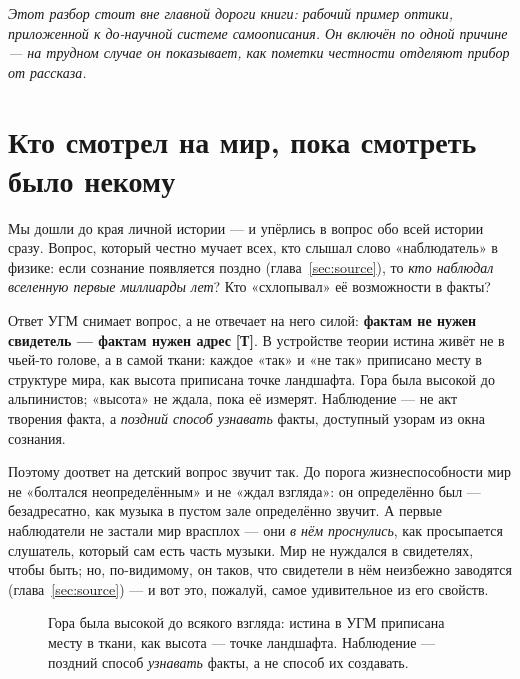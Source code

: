 \documentclass[11pt,letterpaper]{article}
\newcommand{\stT}{\textbf{[Т]}\xspace}
\begin{document}
\noindent\emph{Этот разбор стоит вне главной дороги книги:
рабочий пример оптики, приложенной к до-научной системе
самоописания. Он включён по одной причине --- на трудном случае
он показывает, как пометки честности отделяют прибор от
рассказа.}\medskip

\section{Кто смотрел на мир, пока смотреть было некому}
\label{sec:observer}

Мы дошли до края личной истории --- и упёрлись в вопрос обо всей
истории сразу.
Вопрос, который честно мучает всех, кто слышал слово «наблюдатель»
в физике: если сознание появляется поздно (глава~\ref{sec:source}),
то \emph{кто наблюдал вселенную первые миллиарды лет}? Кто
«схлопывал» её возможности в факты?

Ответ УГМ снимает вопрос, а не отвечает на него силой:
\textbf{фактам не нужен свидетель --- фактам нужен адрес} \stT.
В устройстве теории истина живёт не в чьей-то голове, а в самой
ткани: каждое «так» и «не так» приписано месту в структуре мира,
как высота приписана точке ландшафта. Гора была высокой до
альпинистов; «высота» не ждала, пока её измерят. Наблюдение ---
не акт творения факта, а \emph{поздний способ узнавать} факты,
доступный узорам из окна сознания.

Поэтому доответ на детский вопрос звучит так. До порога
жизнеспособности мир не «болтался неопределённым» и не «ждал
взгляда»: он определённо был --- безадресатно, как музыка в пустом
зале определённо звучит. А первые наблюдатели не застали мир
врасплох --- они \emph{в нём проснулись}, как просыпается слушатель,
который сам есть часть музыки. Мир не нуждался в свидетелях, чтобы
быть; но, по-видимому, он таков, что свидетели в нём неизбежно
заводятся (глава~\ref{sec:source}) --- и вот это, пожалуй, самое
удивительное из его свойств.

\begin{figure}[H]
\centering
{}
\caption{Гора была высокой до всякого взгляда: истина в УГМ приписана
месту в ткани, как высота --- точке ландшафта. Наблюдение --- поздний
способ \emph{узнавать} факты, а не способ их создавать.}
\label{fig:mountain}
\end{figure}
\end{document}
